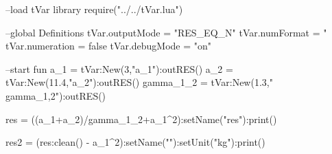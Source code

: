 \documentclass{article}
\begin{document}
\begin{luacode}
	--load tVar library
	require("../../tVar.lua")
	
	--global Definitions
	tVar.outputMode = "RES_EQ_N"
	tVar.numFormat = "%
	tVar.numeration = false
	tVar.debugMode = "on"
	
	
	--start fun
	a_1 = tVar:New(3,"a_1"):outRES()
	a_2 = tVar:New(11.4,"a_2"):outRES()
	gamma_1_2 = tVar:New(1.3,"\\gamma_{1,2}"):outRES()
	
	res = ((a_1+a_2)/gamma_1_2+a_1^2):setName("res"):print()
	
	res2 = (res:clean() - a_1^2):setName(""):setUnit("kg"):print()
\end{luacode}
\end{document}
